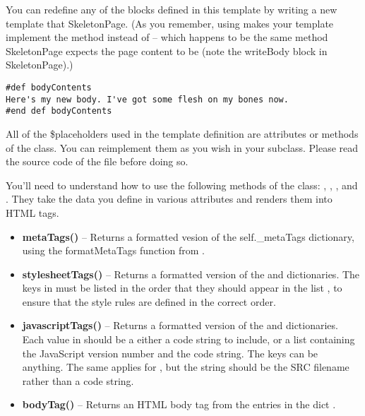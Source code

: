 You can redefine any of the blocks defined in this template by writing a new
template that  SkeletonPage.  (As you remember, using 
 makes your template implement the 
method instead of  -- which happens to be the same method
SkeletonPage expects the page content to be (note the writeBody block in
SkeletonPage).)

\begin{verbatim}
#def bodyContents
Here's my new body. I've got some flesh on my bones now.
#end def bodyContents
\end{verbatim}


All of the \$placeholders used in the  template definition
are attributes or methods of the  class.  You can reimplement
them as you wish in your subclass.  Please read the source code of the file
 before doing so.  

You'll need to understand how to use the following methods of the
 class: , ,
, and .  They take the data you
define in various attributes and renders them into HTML tags.

\begin{itemize}
\item {\bf metaTags()} -- Returns a formatted vesion of the self.\_metaTags
     dictionary, using the formatMetaTags function from
     .
\item {\bf stylesheetTags()} -- Returns a formatted version of the
      and  dictionaries.
     The keys in  must be listed in the order that
     they should appear in the list , to ensure
     that the style rules are defined in the correct order.
\item {\bf javascriptTags()} -- Returns a formatted version of the
      and  dictionaries.
     Each value in  should be a either a code string
     to include, or a list containing the JavaScript version number and the code
     string. The keys can be anything.  The same applies for
     , but the string should be the SRC filename
     rather than a code string.
\item {\bf bodyTag()} -- Returns an HTML body tag from the entries in the dict
     .
\end{itemize}

